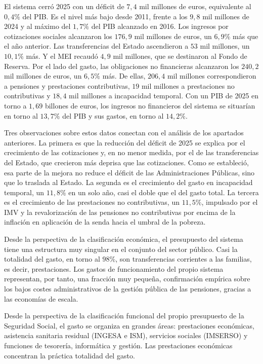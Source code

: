\documentclass[10pt,a4paper]{article}
\begin{document}
El sistema cerró 2025 con un déficit de $7,4$ mil millones de euros, equivalente al $0,4\%$ del PIB. Es el nivel más bajo desde 2011, frente a los $9,8$ mil millones de 2024 y al máximo del $1,7\%$ del PIB alcanzado en 2016. Los ingresos por cotizaciones sociales alcanzaron los $176,9$ mil millones de euros, un $6,9\%$ más que el año anterior. Las transferencias del Estado ascendieron a $53$ mil millones, un $10,1\%$ más. Y el MEI recaudó $4,9$ mil millones, que se destinaron al Fondo de Reserva. Por el lado del gasto, las obligaciones no financieras alcanzaron los $240,2$ mil millones de euros, un $6,5\%$ más. De ellas, $206,4$ mil millones correspondieron a pensiones y prestaciones contributivas, $19$ mil millones a prestaciones no contributivas y $18,4$ mil millones a incapacidad temporal. Con un PIB de 2025 en torno a $1,69$ billones de euros, los ingresos no financieros del sistema se situarían en torno al $13,7\%$ del PIB y sus gastos, en torno al $14,2\%$. 

Tres observaciones sobre estos datos conectan con el análisis de los apartados anteriores. La primera es que la reducción del déficit de 2025 se explica por el crecimiento de las cotizaciones y, en no menor medida, por el de las transferencias del Estado, que crecieron más deprisa que las cotizaciones. Como se estableció, esa parte de la mejora no reduce el déficit de las Administraciones Públicas, sino que lo traslada al Estado. La segunda es el crecimiento del gasto en incapacidad temporal, un $11,8\%$ en un solo año, casi el doble que el del gasto total. La tercera es el crecimiento de las prestaciones no contributivas, un $11,5\%$, impulsado por el IMV y la revalorización de las pensiones no contributivas por encima de la inflación en aplicación de la senda hacia el umbral de la pobreza.

Desde la perspectiva de la clasificación económica, el presupuesto del sistema tiene una estructura muy singular en el conjunto del sector público. Casi la totalidad del gasto, en torno al $98\%$, son transferencias corrientes a las familias, es decir, prestaciones. Los gastos de funcionamiento del propio sistema representan, por tanto, una fracción muy pequeña, confirmación empírica sobre los bajos costes administrativos de la gestión pública de las pensiones, gracias a las economías de escala.

Desde la perspectiva de la clasificación funcional del propio presupuesto de la Seguridad Social, el gasto se organiza en grandes áreas: prestaciones económicas, asistencia sanitaria residual (INGESA e ISM), servicios sociales (IMSERSO) y funciones de tesorería, informática y gestión. Las prestaciones económicas concentran la práctica totalidad del gasto.
\end{document}
